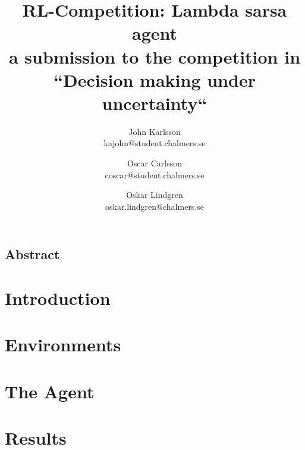 \documentclass[letterpaper,twocolumn,10pt]{article}
\begin{document}
\date{}

\title{ RL-Competition: Lambda sarsa agent\\ \small a submission to the competition in ``Decision making under uncertainty``}

\author{
{\rm John Karlsson}\\
kajohn@student.chalmers.se
\and
{\rm Oscar Carlsson}\\
coscar@student.chalmers.se
\and
{\rm Oskar Lindgren}\\
oskar.lindgren@chalmers.se
}

\maketitle

\thispagestyle{empty}

\subsection*{Abstract}


\section{Introduction}


\section{Environments}


\section{The Agent}


\section{Results}


{\footnotesize 
}

\theendnotes
\end{document}
